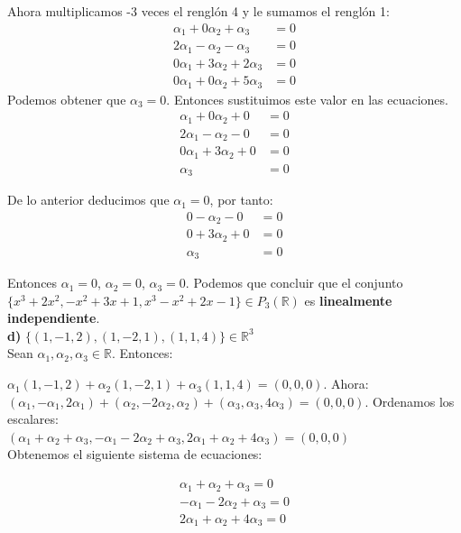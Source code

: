 \documentclass[letterpaper]{article}
\renewcommand{\*}{\cdot}
\theoremstyle{definition}
\begin{document}
Ahora multiplicamos -3 veces el renglón 4 y le sumamos el renglón 1:
	\begin{align*}
	\alpha_{1}+0\alpha_{2}+\alpha_{3}&=0\\
	2\alpha_{1}-\alpha_{2}-\alpha_{3}&=0\\
	0\alpha_{1}+3\alpha_{2}+2\alpha_{3}&=0\\
	0\alpha_{1}+0\alpha_{2}+5\alpha_{3}&=0
	\end{align*}
Podemos obtener que $\alpha_{3}=0$. Entonces sustituimos este valor en las ecuaciones.
	\begin{align*}
	\alpha_{1}+0\alpha_{2}+0&=0\\
	2\alpha_{1}-\alpha_{2}-0&=0\\
	0\alpha_{1}+3\alpha_{2}+0&=0\\
	\alpha_{3}&=0
	\end{align*}

De lo anterior deducimos que $\alpha_{1}= 0$, por tanto:
	\begin{align*}
	0-\alpha_{2}-0&=0\\
	0+3\alpha_{2}+0&=0\\
	\alpha_{3}&=0
	\end{align*}

Entonces $\alpha_{1}=0$, $\alpha_{2}=0$, $\alpha_{3}=0$. Podemos que concluir que el conjunto $\lbrace x^{3} + 2x^{2}, -x^{2} + 3x + 1, x^{3} - x^{2} + 2x -1 \rbrace \in P_{3}(\mathbb{R})$ es \textbf{linealmente independiente}.\\

\textbf{d)} $\lbrace (1,-1,2), (1,-2,1), (1,1,4) \rbrace \in \mathbb{R}^{3}$\\

Sean $\alpha_{1}, \alpha_{2}, \alpha_{3}\in \mathbb{R}$. Entonces:

$\alpha_{1}(1,-1,2)+\alpha_{2}(1,-2,1)+ \alpha_{3}(1,1,4)=(0,0,0)$.
Ahora:\\

$(\alpha_{1},-\alpha_{1},2\alpha_{1})+(\alpha_{2},-2\alpha_{2},\alpha_{2})+ (\alpha_{3},\alpha_{3},4\alpha_{3})=(0,0,0)$. Ordenamos los escalares:\\

$(\alpha_{1}+\alpha_{2}+\alpha_{3}, -\alpha_{1}-2\alpha_{2}+\alpha_{3}, 2\alpha_{1}+\alpha_{2}+4\alpha_{3})= (0,0,0)$\\

Obtenemos el siguiente sistema de ecuaciones:
\begin{center}
	\begin{align*}
	\alpha_{1}+\alpha_{2}+\alpha_{3}=0\\
	-\alpha_{1}-2\alpha_{2}+\alpha_{3}=0\\
	2\alpha_{1}+\alpha_{2}+4\alpha_{3}=0
	\end{align*}
\end{center}
\end{document}
